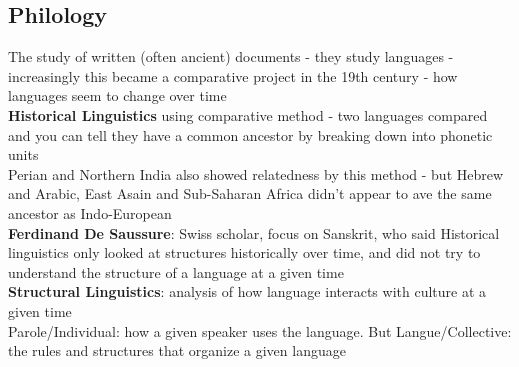 \documentclass{article}
\begin{document}
\subsection{Philology}
The study of written (often ancient) documents - they study languages - increasingly this became a comparative project in the 19th century - how languages seem to change over time \\
\textbf{Historical Linguistics} using comparative method - two languages compared and you can tell they have a common ancestor by breaking down into phonetic units \\
Perian and Northern India also showed relatedness by this method - but Hebrew and Arabic, East Asain and Sub-Saharan Africa didn't appear to ave the same ancestor as Indo-European \\
\textbf{Ferdinand De Saussure}: Swiss scholar, focus on Sanskrit, who said Historical linguistics only looked at structures historically over time, and did not try to understand the structure of a language at a given time \\
\textbf{Structural Linguistics}: analysis of how language interacts with culture at a given time \\
Parole/Individual: how a given speaker uses the language. But Langue/Collective: the rules and structures that organize a given language 
\end{document}
